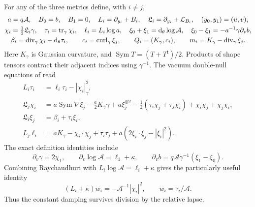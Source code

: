 For any of the three metrics define, with $i\ne j$,
\begin{equation}\label{dn:definitions}
\begin{gathered}
 a=q\mathcal A,\quad B_0=b,\quad B_1=0,\quad
 L_i=\partial_{y_i}+B_i,\quad
 \mathfrak L_i=\partial_{y_i}+\mathcal L_{B_i},\quad (y_0,y_1)=(u,v),\\
 \chi_i=\tfrac12\mathfrak L_i\gamma,\quad
 \tau_i=\operatorname{tr}_\gamma\chi_i,\quad \ell_i=L_i\log a,\quad
 \xi_0+\xi_1=\mathrm d_\theta\log\mathcal A,\quad
 \xi_0-\xi_1=-a^{-1}\gamma\partial_vb,\\
 \beta_i=\operatorname{div}_\gamma\chi_i-\mathrm d_\theta\tau_i,\qquad
 c_i=\operatorname{curl}_\gamma\xi_j,\qquad
 Q_i=(K_\gamma,c_i),\qquad
 m_i=K_\gamma-\operatorname{div}_\gamma\xi_j.
\end{gathered}
\end{equation}
Here $K_\gamma$ is Gaussian curvature, and
$\operatorname{Sym}T=(T+T^{\mathsf t})/2$.  Products of shape tensors
contract their adjacent indices using $\gamma^{-1}$.
The vacuum double-null equations of
\cite[, ]{KerrCTwo} read
\begin{equation}\label{dn:D2}
\begin{aligned}
 L_i\tau_i&=\ell_i\tau_i-|\chi_i|_\gamma^2,\\
 \mathfrak L_j\chi_i
 &=a\operatorname{Sym}\nabla\xi_j-\tfrac a2K_\gamma\gamma
       +a\xi_j^{\otimes2}
       -\tfrac12(\tau_i\chi_j+\tau_j\chi_i)
       +\chi_i\chi_j+\chi_j\chi_i,\\
 \mathfrak L_i\xi_j&=\beta_i+\tau_i\xi_i,\\
 L_j\ell_i&=aK_\gamma-\chi_i\cdot\chi_j+\tau_i\tau_j
                   +a(2\xi_i\cdot\xi_j-|\xi_i|^2).
\end{aligned}
\end{equation}
The exact definition identities include
\begin{equation}\label{dn:recovery-equations}
 \partial_v\gamma=2\chi_1,\qquad
 \partial_v\log\mathcal A=\ell_1+\kappa,\qquad
 \partial_vb=q\mathcal A\gamma^{-1}(\xi_1-\xi_0).
\end{equation}
Combining Raychaudhuri with
$L_i\log\mathcal A=\ell_i+\kappa$ gives the particularly useful identity
\begin{equation}\label{dn:damped-trace}
 (L_i+\kappa)w_i=-\mathcal A^{-1}|\chi_i|^2,
                  \qquad w_i=\tau_i/\mathcal A.
\end{equation}
Thus the constant damping survives division by the relative lapse.

